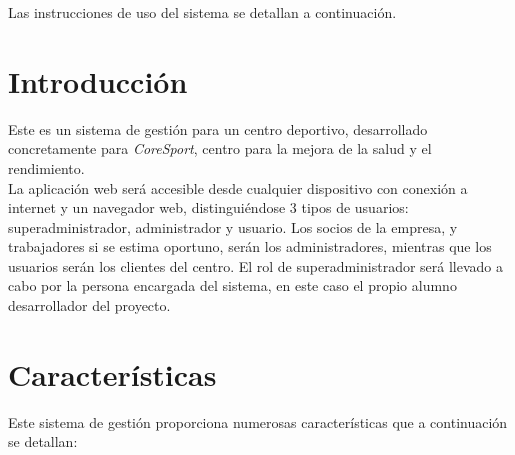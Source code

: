 
\label{sec:manual-usuario}

Las instrucciones de uso del sistema se detallan a continuación.

\section{Introducción}

Este es un sistema de gestión para un centro deportivo, desarrollado concretamente para \textit{CoreSport}, centro para la mejora de la salud y el rendimiento. \\

La aplicación web será accesible desde cualquier dispositivo con conexión a internet y un navegador web, distinguiéndose 3 tipos de usuarios: superadministrador, administrador y usuario. Los socios de la empresa, y trabajadores si se estima oportuno, serán los administradores, mientras que los usuarios serán los clientes del centro. El rol de superadministrador será llevado a cabo por la persona encargada del sistema, en este caso el propio alumno desarrollador del proyecto. 


\section{Características}

Este sistema de gestión proporciona numerosas características que a continuación se detallan: 

